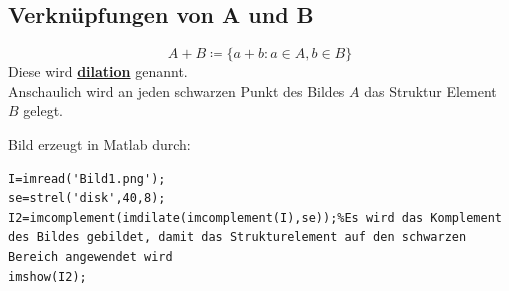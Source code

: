 \documentclass[ngerman]{article}
\theoremstyle{plain}
\theoremstyle{definition}
\numberwithin{equation}{section}
\newcommand{\mim}[1] {
\underline{\textbf{#1\index{#1}}}
}
\begin{document}
    \subsection{Verknüpfungen von A und B}
        \[A+B  \coloneqq  \{a + b : a \in A, b \in B\}\]
        Diese wird \mim{dilation} genannt.\\
        Anschaulich wird an jeden schwarzen Punkt des Bildes $A$ das Struktur Element $B$ gelegt.
        \begin{center}
        \end{center}
        Bild erzeugt in Matlab durch:\\
        \begin{lstlisting}
I=imread('Bild1.png');
se=strel('disk',40,8);
I2=imcomplement(imdilate(imcomplement(I),se));%Es wird das Komplement des Bildes gebildet, damit das Strukturelement auf den schwarzen Bereich angewendet wird
imshow(I2);
        \end{lstlisting}
\end{document}
